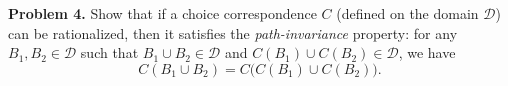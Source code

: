 \documentclass[12pt,english]{article}
\begin{document}
\bigskip

\noindent\textbf{Problem 4.} 
Show that if a choice correspondence $C$
(defined on the domain $\mathcal{D}$) can be rationalized, then it satisfies the \emph{path-invariance} property: for any $B_{1},B_{2}\in \mathcal{D}$ such that $B_{1}\cup B_{2}\in \mathcal{D}$ and $C(B_{1})\cup C(B_{2})\in \mathcal{D}$,
we have $$C(B_{1}\cup B_{2})= C\big(C(B_{1})\cup C(B_{2})\big).$$












  
\end{document}
